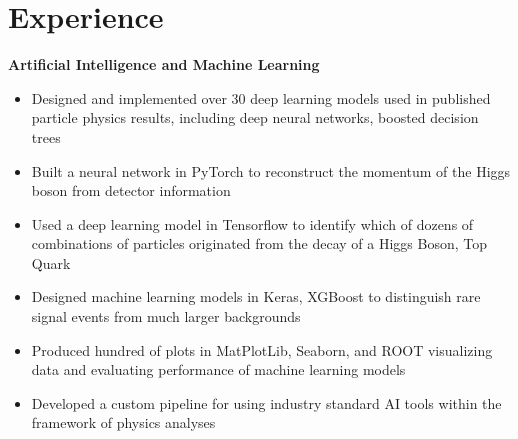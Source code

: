\documentclass[a4paper,10pt]{article}
\begin{document}
\section{Experience}
\vspace{2mm}
\textbf{Artificial Intelligence and Machine Learning}
\vspace{1mm}
\begin{itemize}[leftmargin=*, topsep=0.5pt, itemsep=0.5pt, parsep=0.pt]
        \item Designed and implemented over 30 deep learning models used in published particle physics results, including deep neural networks, boosted decision trees
        \item Built a neural network in PyTorch to reconstruct the momentum of the Higgs boson from detector information
        \item Used a deep learning model in Tensorflow to identify which of dozens of combinations of particles originated from the decay of a Higgs Boson, Top Quark
        \item Designed machine learning models in Keras, XGBoost to distinguish rare signal events from much larger backgrounds
        \item Produced hundred of plots in MatPlotLib, Seaborn, and ROOT visualizing data and evaluating performance of machine learning models 
        \item Developed a custom pipeline for using industry standard AI tools within the framework of physics analyses 
    
\end{itemize}
\end{document}

